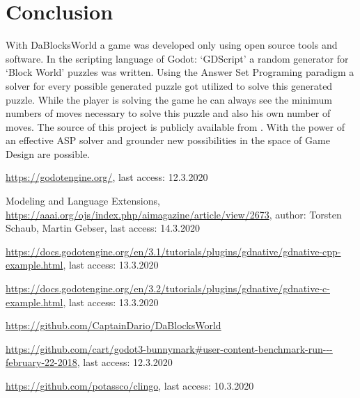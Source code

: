 \documentclass[runningheads]{llncs}
\begin{document}
\section{Conclusion}
With DaBlocksWorld \cite{daBlocksWorldGithub} a game was developed only using open source tools and software.
In the scripting language of Godot: `GDScript' a random generator for `Block World' puzzles was written.
Using the Answer Set Programing paradigm a solver for every possible generated puzzle got utilized to solve this generated puzzle.
While the player is solving the game he can always see the minimum numbers of moves necessary to solve this puzzle and also his own number of moves.\newline
The source of this project is publicly available from \cite{daBlocksWorldGithub}.\newline
With the power of an effective ASP solver and grounder new possibilities in the space of Game Design are possible. 


\begin{thebibliography}{8}

        \url{https://godotengine.org/},
        last access: 12.3.2020

        Modeling and Language Extensions,
        \url{https://aaai.org/ojs/index.php/aimagazine/article/view/2673},
        author: Torsten Schaub, Martin Gebser,
        last access: 14.3.2020

        \url{https://docs.godotengine.org/en/3.1/tutorials/plugins/gdnative/gdnative-cpp-example.html},
        last access: 13.3.2020

        \url{https://docs.godotengine.org/en/3.2/tutorials/plugins/gdnative/gdnative-c-example.html},
        last access: 13.3.2020

        \url{https://github.com/CaptainDario/DaBlocksWorld}

        \url{https://github.com/cart/godot3-bunnymark#user-content-benchmark-run---february-22-2018},
        last access: 12.3.2020

        \url{https://github.com/potassco/clingo},
        last access: 10.3.2020

\end{thebibliography}
\end{document}

